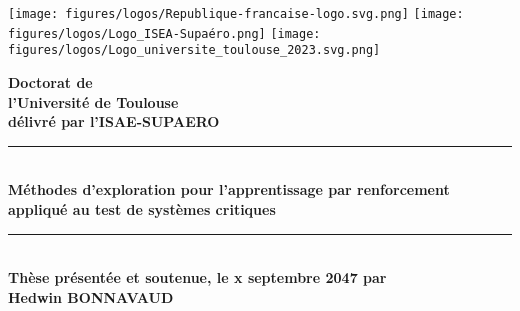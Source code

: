 \documentclass[a4paper,12pt]{article}
\begin{document}
\texttt{[image: figures/logos/Republique-francaise-logo.svg.png]}  %
\texttt{[image: figures/logos/Logo\_ISEA-Supaéro.png]}  %
\texttt{[image: figures/logos/Logo\_universite\_toulouse\_2023.svg.png]}  %

\begin{flushright}
    \textbf{\huge Doctorat de\\ l'Université de Toulouse} \\[0.5cm]
    \textbf{\large délivré par l'ISAE-SUPAERO} \\[2cm]
    
    \noindent\rule{8cm}{0.4pt}  %
    \\[0.5cm]
    \textbf{\large Méthodes d'exploration pour l'apprentissage par renforcement appliqué au test de systèmes critiques} \\[1.5cm]
    \noindent\rule{8cm}{0.4pt}  %
    \\[1.5cm]
    
    \textbf{\Large Thèse présentée et soutenue, le x septembre 2047 par} \\[0.5cm]
    
    {\huge \textbf{Hedwin BONNAVAUD}} \\[2cm]
\end{flushright}
\end{document}
